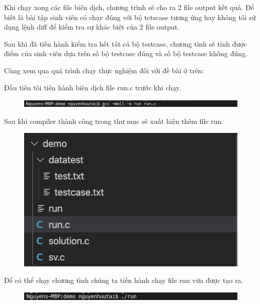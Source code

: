 \documentclass[12pt,a4paper]{article}
\begin{document}
Khi chạy xong các file biên dịch, chương trình sẽ cho ra 2 file output kết quả. Để biết là bài tập sinh viên có chạy đúng với bộ tetscase tương ứng hay không tôi sử dụng lệnh diff để kiểm tra sự khác biệt của 2 file output.

Sau khi đã tiến hành kiểm tra hết tất cả bộ testcase, chương tình sẽ tính  được điểm của sinh viên dựa trên số bộ testcase đúng và số bộ testcase không đúng.

Cùng xem qua quá trình chạy thực nghiệm đối với đề bài ở trên:

Đầu tiên tôi tiến hành biên dịch file run.c trước khi chạy.

\begin{figure}[ht]
\begin{center}
\includegraphics[scale=.3]{hinhanh/compilerdemo.png}
\end{center}
\end{figure}

Sau khi compiler thành công trong thư mục sẽ xuất hiện thêm file run.

\begin{figure}[ht]
\begin{center}
\includegraphics[scale=.3]{hinhanh/cautrucsaucompiler.png}
\end{center}
\end{figure}

Để có thể chạy chương tình chúng ta tiến hành chạy file run vừa được tạo ra.

\begin{figure}[ht]
\begin{center}
\includegraphics[scale=.3]{hinhanh/rundemo.png}
\end{center}
\end{figure}
\end{document}

